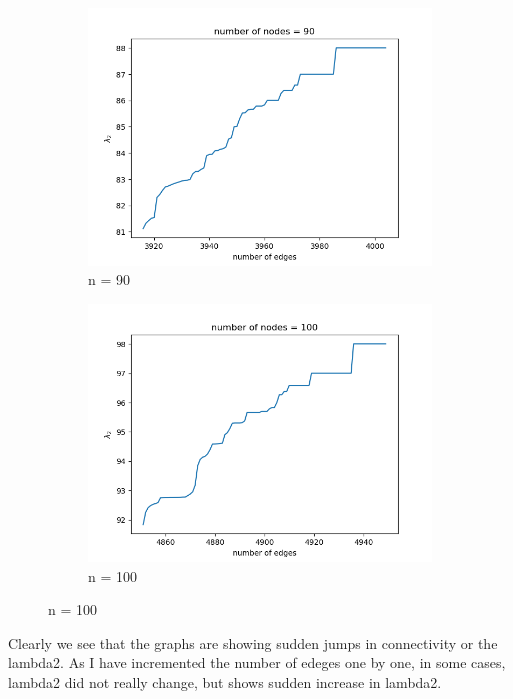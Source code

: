 \documentclass{article}
\begin{document}
\begin{problem}
\begin{figure}[!h]
    \begin{subfigure}{0.35\textwidth}
        \includegraphics[width=\textwidth]{./img/p5_node90.png}
        \caption{n = 90 }
    \end{subfigure}
    \begin{subfigure}{0.35\textwidth}
        \includegraphics[width=\textwidth]{./img/p5_node100.png}
        \caption{n = 100 }
    \end{subfigure}
\end{figure}


Clearly we see that the graphs are showing sudden jumps in connectivity or the lambda2. As I have incremented the number of edeges one by one, in some cases, lambda2 did not really change, but shows sudden increase in lambda2. 
\end{problem}
\newpage
\end{document}
